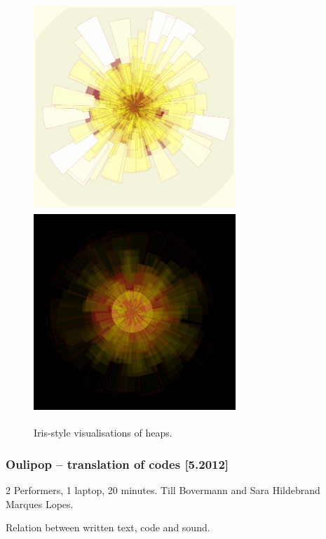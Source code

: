 \documentclass[letterpaper, 12pt]{article}
\begin{document}
\begin{figure}
	\centering
		\includegraphics[width=3in, height=3in]{2013-heapIris-white}
		\includegraphics[width=3in, height=3in]{2013-heapIris-black}
	\caption{Iris-style visualisations of heaps.}
	\label{fig:fig_2013-heapIris-white}
\end{figure}



\subsubsection{Oulipop -- translation of codes [5.2012]}
\label{sub:oulipop}
2 Performers, 1 laptop, 20 minutes. Till Bovermann and Sara Hildebrand Marques Lopes.

Relation between written text, code and sound.
\end{document}
